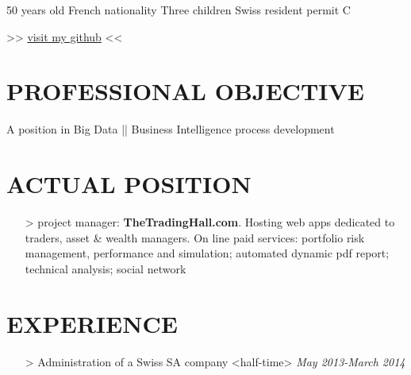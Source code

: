 \documentclass{res}
\begin{document}
\color{mygreen}
\pagecolor{myblack}


\address{Rue de la Dôle, 12 - 1203 Geneva  +41~(79)~392~79~56  \href{mailto:arnaud.gaboury@gmail.com}{arnaud.gaboury@gmail.com}        }
\begin{resume}%
                        
\begin{center}  
\vspace{-0.8 cm}
50 years  old  French nationality  Three children  Swiss resident permit C 


\setlength{\fboxsep}{10pt}%

\textmd{>> \href{https://github.com/gabx}{visit my github} <<}
\end{center} 
\section{PROFESSIONAL OBJECTIVE}  
A position in Big Data || Business Intelligence process development 

\section{ACTUAL POSITION}
\begin{enumerate}[leftmargin=0cm]
\item[>] project manager: \textbf{{\color{mylightblue}TheTradingHall.com}}. Hosting web apps dedicated to traders, asset \& wealth managers. On line paid services: portfolio risk management, performance and simulation; automated dynamic pdf report; technical analysis; social network
\end{enumerate}
\section{EXPERIENCE}
\begin{enumerate}[leftmargin=0cm]
\item[>]Administration of a Swiss SA company <half-time>
\hfill \textit{May 2013-March 2014}


\end{enumerate}
\end{resume}
\end{document}
